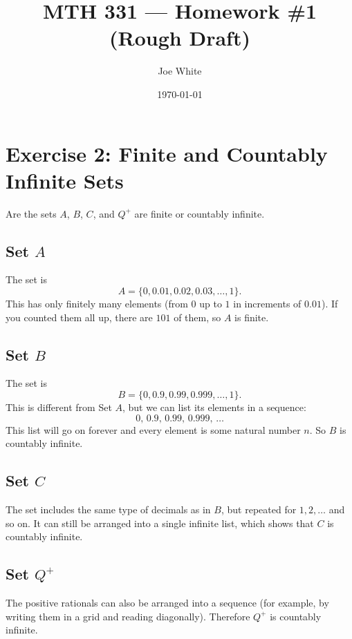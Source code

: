 \documentclass[11pt]{article}
\title{MTH 331 — Homework \#1 (Rough Draft)}
\author{Joe White}
\date{\today}
\begin{document}
\maketitle

\section*{Exercise 2: Finite and Countably Infinite Sets}

Are the sets $A$, $B$, $C$, and $Q^+$ are finite or countably infinite.

\subsection*{Set $A$}
The set is 
\[
A = \{0, 0.01, 0.02, 0.03, \dots, 1\}.
\]
This has only finitely many elements (from $0$ up to $1$ in increments of $0.01$). If you counted them all up, there are $101$ of them, so $A$ is finite.

\subsection*{Set $B$}
The set is
\[
B = \{0, 0.9, 0.99, 0.999, \dots, 1\}.
\]
This is different from Set $A$, but we can list its elements in a sequence:
\[
0,\,0.9,\,0.99,\,0.999,\,\dots
\]
This list will go on forever and every element is some natural number $n$. So $B$ is countably infinite.

\subsection*{Set $C$}
The set includes the same type of decimals as in $B$, but repeated for $1, 2, \dots$ and so on.
It can still be arranged into a single infinite list, which shows that $C$ is countably infinite.

\subsection*{Set $Q^+$}
The positive rationals can also be arranged into a sequence (for example, by writing them in a grid and reading diagonally). Therefore $Q^+$ is countably infinite.
\end{document}
